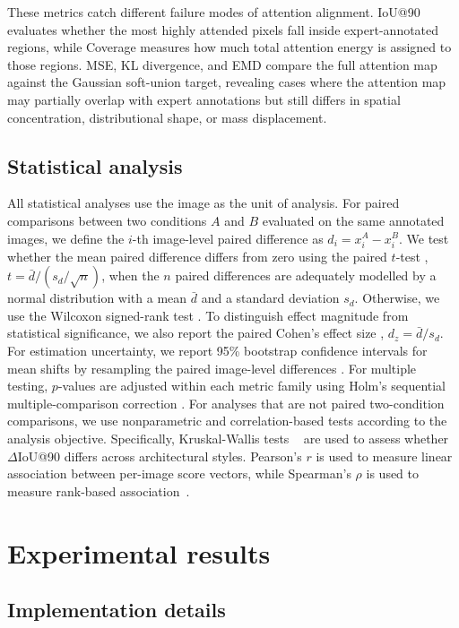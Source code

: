 \documentclass[lineno,pdflatex,sn-mathphys-num]{sn-jnl}%
\theoremstyle{thmstyleone}%
\theoremstyle{thmstyletwo}%
\theoremstyle{thmstylethree}%
\begin{document}
These metrics catch different failure modes of attention alignment. IoU@90 evaluates whether the most highly attended pixels fall inside expert-annotated regions, while Coverage measures how much total attention energy is assigned to those regions. MSE, KL divergence, and EMD compare the full attention map against the Gaussian soft-union target, revealing cases where the attention map may partially overlap with expert annotations but still differs in spatial concentration, distributional shape, or mass displacement.

\subsection{Statistical analysis}

All statistical analyses use the image as the unit of analysis. For paired comparisons between two conditions $A$ and $B$ evaluated on the same annotated images, we define the $i$-th image-level paired difference as $d_i=x_i^A-x_i^B$. We test whether the mean paired difference differs from zero using the paired $t$-test \cite{SciPy}, $t=\bar d/(s_d/\sqrt n)$, when the $n$ paired differences are adequately modelled by a normal distribution with a mean $\bar d$ and a standard deviation $s_d$. Otherwise, we use the Wilcoxon signed-rank test \cite{SciPy}. To distinguish effect magnitude from statistical significance, we also report the paired Cohen's effect size \cite{Cohen1988, Lakens2013}, $d_z=\bar d/s_d$. For estimation uncertainty, we report 95\% bootstrap confidence intervals for mean shifts by resampling the paired image-level differences \cite{SciPy}. For multiple testing, $p$-values are adjusted within each metric family using Holm's sequential multiple-comparison correction \cite{Holm1979}. For analyses that are not paired two-condition comparisons, we use nonparametric and correlation-based tests according to the analysis objective. Specifically, Kruskal-Wallis tests ~\cite{SciPy} are used to assess whether $\Delta$IoU@90 differs across architectural styles. Pearson's $r$ is used to measure linear association between per-image score vectors, while Spearman's $\rho$ is used to measure rank-based association~\cite{SciPy}.


\section{Experimental results} \label{section results}

\subsection{Implementation details}
\end{document}
